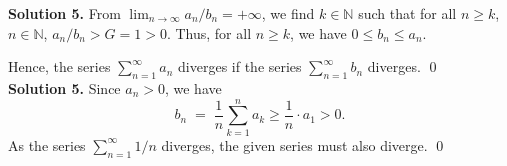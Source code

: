 \documentclass[10pt]{article}
\begin{document}
        \textbf{Solution 5.}
        From $\lim_{n \to \infty} a_n/ b_n = +\infty$, we find $k \in \mathbb{N}$ such that for all $n \ge k$, $n \in \mathbb{N}$,
        $a_n / b_n > G = 1 > 0$. Thus, for all $n\ge k$, we have $0 \le b_n \le a_n$.
        
        Hence, the series $\sum_{n = 1}^{\infty} a_n$ diverges if the series $\sum_{n = 1}^\infty b_n$ diverges. \qed\\

        \textbf{Solution 5.} Since $a_n > 0$, we have
        \[
                b_n \;=\; \frac{1}{n}\sum_{k = 1}^n a_k \ge \frac{1}{n} \cdot a_1 > 0.
        \]
        As the series $\sum_{n = 1}^\infty 1 /n$ diverges, the given series must also diverge. \qed\\
\end{document}
